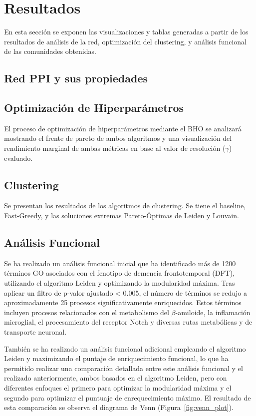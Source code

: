 \section{Resultados}
En esta sección se exponen las visualizaciones y tablas generadas a partir de los resultados de análisis de la red, optimización del clustering, y análisis funcional de las comunidades obtenidas. 

\subsection{Red PPI y sus propiedades}



\newpage

\subsection{Optimización de Hiperparámetros}

El proceso de optimización de hiperparámetros mediante el BHO se analizará mostrando el frente de pareto de ambos algoritmos y una visualización del rendimiento marginal de ambas métricas en base al valor de resolución (\(\gamma\)) evaluado.


\subsection{Clustering}

Se presentan los resultados de los algoritmos de clustering. Se tiene el baseline, Fast-Greedy, y las soluciones extremas Pareto-Óptimas de Leiden y Louvain.

\subsection{Análisis Funcional}

Se ha realizado un análisis funcional inicial que ha identificado más de 1200 términos GO asociados con el fenotipo de demencia frontotemporal (DFT), utilizando el algoritmo Leiden y optimizando la modularidad máxima. Tras aplicar un filtro de p-valor ajustado \textless{} 0.005, el número de términos se redujo a aproximadamente 25 procesos significativamente enriquecidos. Estos términos incluyen procesos relacionados con el metabolismo del \(\beta\)-amiloide, la inflamación microglial, el procesamiento del receptor Notch y diversas rutas metabólicas y de transporte neuronal.

También se ha realizado un análisis funcional adicional empleando el algoritmo Leiden y maximizando el puntaje de enriquecimiento funcional, lo que ha permitido realizar una comparación detallada entre este análisis funcional y el realizado anteriormente, ambos basados en el algoritmo Leiden, pero con diferentes enfoques el primero para optimizar la modularidad máxima y el segundo para optimizar el puntuaje de enrequecimiento máximo. El resultado de esta comparación se observa el diagrama de Venn (Figura~\ref{fig:venn_plot}).

